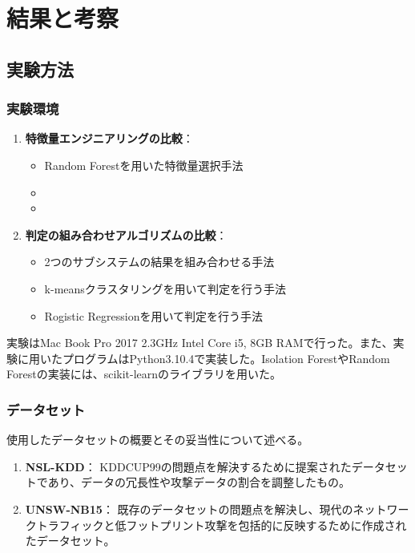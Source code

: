 \documentclass{css}
\begin{document}
\section{結果と考察}

\subsection{実験方法}

\subsubsection{実験環境}
\begin{enumerate}
    \item \textbf{特徴量エンジニアリングの比較}：
        \begin{itemize}
            \item Random Forestを用いた特徴量選択手法
            \item
            \item
        \end{itemize}
    \item \textbf{判定の組み合わせアルゴリズムの比較}：
        \begin{itemize}
            \item 2つのサブシステムの結果を組み合わせる手法
            \item k-meansクラスタリングを用いて判定を行う手法
            \item Rogistic Regressionを用いて判定を行う手法
        \end{itemize}
\end{enumerate}

実験はMac Book Pro 2017 2.3GHz Intel Core i5, 8GB RAMで行った。また、実験に用いたプログラムはPython3.10.4で実装した。Isolation ForestやRandom Forestの実装には、scikit-learnのライブラリを用いた。

\subsubsection{データセット}
使用したデータセットの概要とその妥当性について述べる。
\begin{enumerate}
    \item \textbf{NSL-KDD}：
        KDDCUP99の問題点を解決するために提案されたデータセットであり、データの冗長性や攻撃データの割合を調整したもの。
    \item \textbf{UNSW-NB15}：
        既存のデータセットの問題点を解決し、現代のネットワークトラフィックと低フットプリント攻撃を包括的に反映するために作成されたデータセット。
\end{enumerate}
\end{document}
